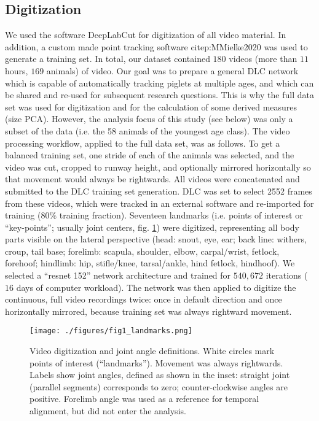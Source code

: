 \subsection{Digitization}
\label{sec:org3ecf574}
We used the software DeepLabCut \citep[DLC,][]{Mathis2018} for digitization of all video material.
In addition, a custom made point tracking software citep:MMielke2020 was used to generate a training set.
In total, our dataset contained \(180\) videos (more than \(11\) hours, \(169\) animals) of video.
Our goal was to prepare a general DLC network which is capable of automatically tracking piglets at multiple ages, and which can be shared and re-used for subsequent research questions.
This is why the full data set was used for digitization and for the calculation of some derived measures (size PCA).
However, the analysis focus of this study (see below) was only a subset of the data (i.e. the 58 animals of the youngest age class).
The video processing workflow, applied to the full data set, was as follows.
To get a balanced training set, one stride of each of the animals was selected, and the video was cut, cropped to runway height, and optionally mirrored horizontally so that movement would always be rightwards.
All videos were concatenated and submitted to the DLC training set generation.
DLC was set to select 2552 frames from these videos, which were tracked in an external software and re-imported for training (\(80 \%\) training fraction).
Seventeen landmarks (i.e. points of interest or ``key-points''; usually joint centers, fig. \ref{fig:landmarks}) were digitized, representing all body parts visible on the lateral perspective (head: snout, eye, ear; back line: withers, croup, tail base; forelimb: scapula, shoulder, elbow, carpal/wrist, fetlock, forehoof; hindlimb: hip, stifle/knee, tarsal/ankle, hind fetlock, hindhoof).
We selected a ``resnet 152'' network architecture and trained for \(540,672\) iterations (\(16\) days of computer workload).
The network was then applied to digitize the continuous, full video recordings twice: once in default direction and once horizontally mirrored, because training set was always rightward movement.

\begin{figure}[t]
\centering
\texttt{[image: ./figures/fig1\_landmarks.png]}
\caption{\label{fig:landmarks}Video digitization and joint angle definitions. White circles mark points of interest (``landmarks''). Movement was always rightwards. Labels show joint angles, defined as shown in the inset: straight joint (parallel segments) corresponds to zero; counter-clockwise angles are positive. Forelimb angle was used as a reference for temporal alignment, but did not enter the analysis.}
\end{figure}



